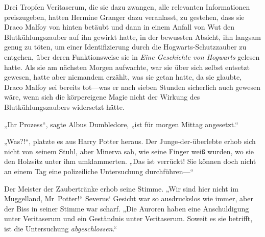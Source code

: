 Drei Tropfen Veritaserum, die sie dazu zwangen, alle relevanten Informationen preiszugeben, hatten Hermine Granger dazu veranlasst, zu gestehen, dass sie Draco Malfoy von hinten betäubt und dann in einem Anfall von Wut den Blutkühlungszauber auf ihn gewirkt hatte, in der bewussten Absicht, ihn langsam genug zu töten, um einer Identifizierung durch die Hogwarts-Schutzzauber zu entgehen, über deren Funktionsweise sie in \emph{Eine Geschichte von Hogwarts} gelesen hatte. Als sie am nächsten Morgen aufwachte, war sie über sich selbst entsetzt gewesen, hatte aber niemandem erzählt, was sie getan hatte, da sie glaubte, Draco Malfoy sei bereits tot—was er nach sieben Stunden sicherlich auch gewesen wäre, wenn sich die körpereigene Magie nicht der Wirkung des Blutkühlungszaubers widersetzt hätte.

„Ihr Prozess“, sagte Albus Dumbledore, „ist für morgen Mittag angesetzt.“

„Was?!“, platzte es aus Harry Potter heraus.
Der Junge-der-überlebte erhob sich nicht von seinem Stuhl, aber Minerva sah, wie seine Finger weiß wurden, wo sie den Holzsitz unter ihm umklammerten.
„Das ist verrückt! Sie können doch nicht an einem Tag eine polizeiliche Untersuchung durchführen—“

Der Meister der Zaubertränke erhob seine Stimme.
„Wir sind hier nicht im Muggelland, Mr~Potter!“
Severus‘ Gesicht war so ausdruckslos wie immer, aber der Biss in seiner Stimme war scharf.
„Die Auroren haben eine Anschuldigung unter Veritaserum und ein Geständnis unter Veritaserum. Soweit es sie betrifft, ist die Untersuchung \emph{abgeschlossen}.“

